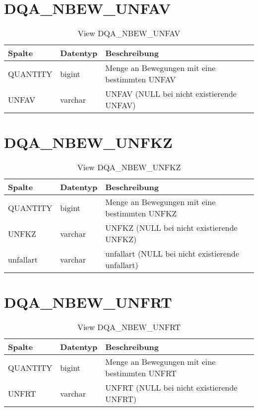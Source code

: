   \section{DQA\_NBEW\_UNFAV}

  \begin{table}[ht]
    \centering
    \caption{View DQA\_NBEW\_UNFAV}
    \label{tab:dqanbewunfav}
    \begin{tabular}{||l|l|p{10cm}||}
      \hline
      Spalte & Datentyp & Beschreibung \\ [0.5ex] \hline \hline
QUANTITY & bigint & Menge an Bewegungen mit eine bestimmten UNFAV \\ \hline
UNFAV & varchar & UNFAV (NULL bei nicht existierende UNFAV)\\ \hline
    \end{tabular}
  \end{table}
 \clearpage
  \section{DQA\_NBEW\_UNFKZ}

  \begin{table}[ht]
    \centering
    \caption{View DQA\_NBEW\_UNFKZ}
    \label{tab:dqanbewunfkz}
    \begin{tabular}{||l|l|p{10cm}||}
      \hline
      Spalte & Datentyp & Beschreibung \\ [0.5ex] \hline \hline
QUANTITY & bigint & Menge an Bewegungen mit eine bestimmten UNFKZ \\ \hline
UNFKZ & varchar & UNFKZ (NULL bei nicht existierende UNFKZ)\\ \hline
unfallart & varchar & unfallart (NULL bei nicht existierende unfallart)\\ \hline
    \end{tabular}
  \end{table}
 \clearpage
  \section{DQA\_NBEW\_UNFRT}

  \begin{table}[ht]
    \centering
    \caption{View DQA\_NBEW\_UNFRT}
    \label{tab:dqanbewunfrt}
    \begin{tabular}{||l|l|p{10cm}||}
      \hline
      Spalte & Datentyp & Beschreibung \\ [0.5ex] \hline \hline
QUANTITY & bigint & Menge an Bewegungen mit eine bestimmten UNFRT \\ \hline
UNFRT & varchar & UNFRT (NULL bei nicht existierende UNFRT)\\ \hline
    \end{tabular}
  \end{table}
 \clearpage
